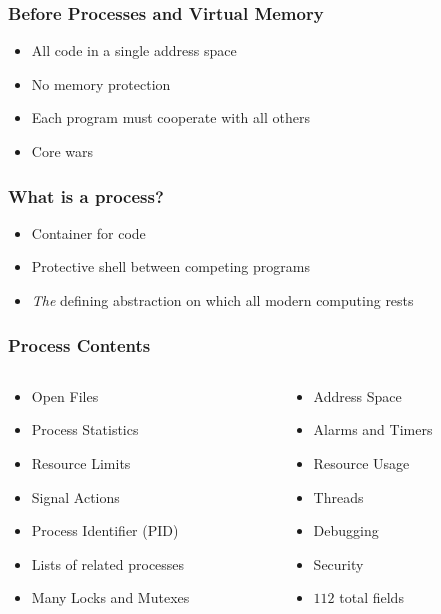\documentclass[pdftex]{beamer} %
\begin{document}
\begin{frame}
  \frametitle{Before Processes and Virtual Memory}
  \begin{itemize}
  \item All code in a single address space
  \item No memory protection
  \item Each program must cooperate with all others
  \item Core wars
  \end{itemize}
\end{frame}

\begin{frame}
  \frametitle{What is a process?}
  \begin{itemize}
  \item Container for code
  \item Protective shell between competing programs
  \item \emph{The} defining abstraction on which all modern computing rests
  \end{itemize}
\end{frame}

\begin{frame}
  \frametitle{Process Contents}
\begin{columns}[t]
    \begin{column}{5cm}
      \begin{itemize}
      \item Open Files
      \item Process Statistics
      \item Resource Limits
      \item Signal Actions
      \item Process Identifier (PID)
      \item Lists of related processes
      \item Many Locks and Mutexes
      \end{itemize}
    \end{column}
    \begin{column}{5cm}
      \begin{itemize}
      \item Address Space
      \item Alarms and Timers
      \item Resource Usage
      \item Threads
      \item Debugging 
      \item Security
      \item $112$ total fields
      \end{itemize}
    \end{column}
  \end{columns}
\end{frame}
\end{document}
